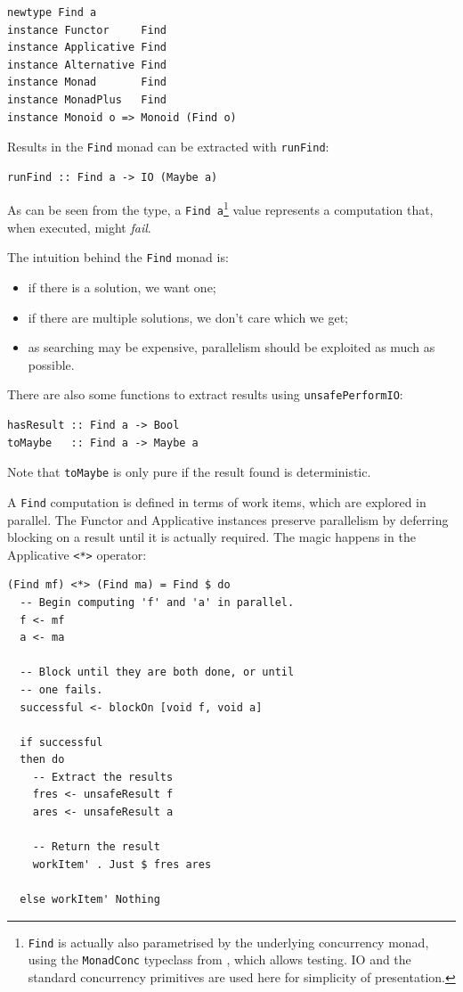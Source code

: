 \begin{verbatim}
newtype Find a
instance Functor     Find
instance Applicative Find
instance Alternative Find
instance Monad       Find
instance MonadPlus   Find
instance Monoid o => Monoid (Find o)
\end{verbatim}

Results in the \verb|Find| monad can be extracted with \verb|runFind|:

\begin{verbatim}
runFind :: Find a -> IO (Maybe a)
\end{verbatim}

As can be seen from the type, a \verb|Find a|\footnote{\texttt{Find}
  is actually also parametrised by the underlying concurrency monad,
  using the \texttt{MonadConc} typeclass from \dejafu{}, which allows
  testing. IO and the standard concurrency primitives are used here
  for simplicity of presentation.} value represents a computation
that, when executed, might \textit{fail}.

The intuition behind the \verb|Find| monad is:

\begin{itemize}
  \item if there is a solution, we want one;

  \item if there are multiple solutions, we don't care which we get;

  \item as searching may be expensive, parallelism should be exploited
    as much as possible.
\end{itemize}

There are also some functions to extract results using
\verb|unsafePerformIO|:

\begin{verbatim}
hasResult :: Find a -> Bool
toMaybe   :: Find a -> Maybe a
\end{verbatim}

Note that \verb|toMaybe| is only pure if the result found is
deterministic.

A \verb|Find| computation is defined in terms of work items, which are
explored in parallel. The Functor and Applicative instances preserve
parallelism by deferring blocking on a result until it is actually
required. The magic happens in the Applicative \verb|<*>| operator:

\begin{verbatim}
(Find mf) <*> (Find ma) = Find $ do
  -- Begin computing 'f' and 'a' in parallel.
  f <- mf
  a <- ma

  -- Block until they are both done, or until
  -- one fails.
  successful <- blockOn [void f, void a]

  if successful
  then do
    -- Extract the results
    fres <- unsafeResult f
    ares <- unsafeResult a

    -- Return the result
    workItem' . Just $ fres ares

  else workItem' Nothing
\end{verbatim}

